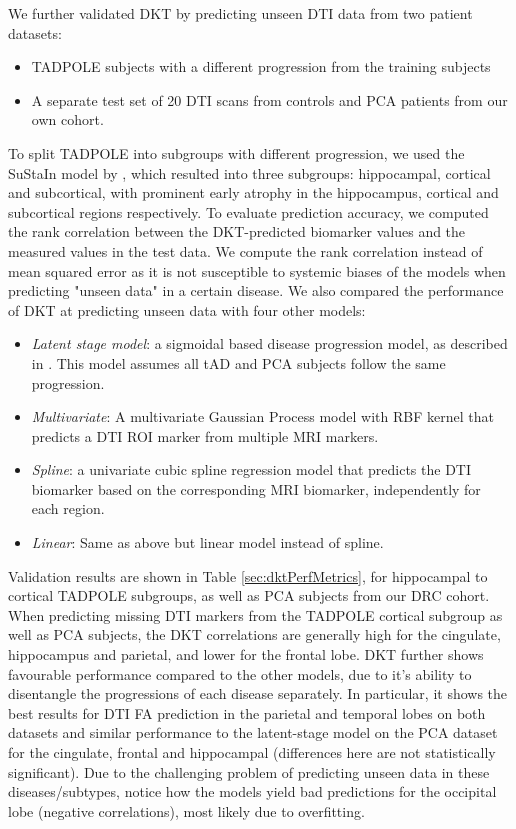 We further validated DKT by predicting unseen DTI data from two patient datasets:
\begin{itemize}
 \item TADPOLE subjects with a different progression from the training subjects
 \item A separate test set of 20 DTI scans from controls and PCA patients from our own cohort.
\end{itemize}

To split TADPOLE into subgroups with different progression, we used the SuStaIn model by \cite{young2018uncovering}, which resulted into three subgroups: hippocampal, cortical and subcortical, with prominent early atrophy in the hippocampus, cortical and subcortical regions respectively. To evaluate prediction accuracy, we computed the rank correlation between the DKT-predicted biomarker values and the measured values in the test data. We compute the rank correlation instead of mean squared error as it is not susceptible to systemic biases of the models when predicting "unseen data" in a certain disease. We also compared the performance of DKT at predicting unseen data with four other models: 
\begin{itemize}
 \item \emph{Latent stage model}: a sigmoidal based disease progression model, as described in \cite{jedynak2012computational}. This model assumes all tAD and PCA subjects follow the same progression.
 \item \emph{Multivariate}: A multivariate Gaussian Process model with RBF kernel that predicts a DTI ROI marker from multiple MRI markers.
 \item \emph{Spline}: a univariate cubic spline regression model that predicts the DTI biomarker based on the corresponding MRI biomarker, independently for each region.
 \item \emph{Linear}: Same as above but linear model instead of spline.
\end{itemize}



Validation results are shown in Table \ref{sec:dktPerfMetrics}, for hippocampal to cortical TADPOLE subgroups, as well as PCA subjects from our DRC cohort. When predicting missing DTI markers from the TADPOLE cortical subgroup as well as PCA subjects, the DKT correlations are generally high for the cingulate, hippocampus and parietal, and lower for the frontal lobe. DKT further shows favourable performance compared to the other models, due to it's ability to disentangle the progressions of each disease separately. In particular, it shows the best results for DTI FA prediction in the parietal and temporal lobes on both datasets and similar performance to the latent-stage model on the PCA dataset for the cingulate, frontal and hippocampal (differences here are not statistically significant). Due to the challenging problem of predicting unseen data in these diseases/subtypes, notice how the models yield bad predictions for the occipital lobe (negative correlations), most likely due to overfitting.



